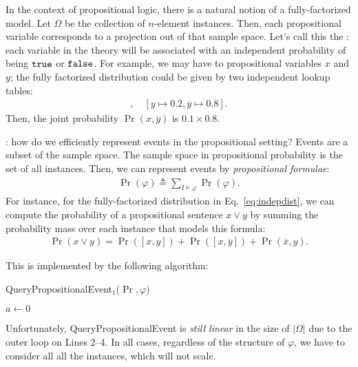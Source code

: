 \documentclass{tufte-handout}
\begin{document}
In the context of propositional logic, there is a natural notion of a
fully-factorized model. Let $\Omega$ be the collection of $n$-element instances.
Then, each propositional variable corresponds to a projection out of that sample
space. Let's call this the : each 
variable in the theory will be associated with an independent probability of 
being $\texttt{true}$ or $\texttt{false}$. For example, we may have to propositional variables $x$ and 
$y$; the fully factorized distribution could be given by two independent lookup tables:
\begin{align}
    [x \mapsto 0.1, \overline{x} \mapsto 0.9], \quad [y \mapsto 0.2, \overline{y} \mapsto 0.8].
    \label{eq:indepdist}
\end{align}
Then, the joint probability $\Pr(x, \overline{y})$ is $0.1 \times 0.8$.

: how do we efficiently represent 
events in the propositional setting? Events are a subset of the sample space. 
The sample space in propositional probability is the set of all instances. Then, 
we can represent events by \emph{propositional formulae}:
\begin{align}
    \Pr(\varphi) \triangleq \sum_{I \models \varphi} \Pr(\varphi).
\end{align}
For instance, for the fully-factorized 
distribution in Eq.~\ref{eq:indepdist}, we can compute the probability of a 
propositional sentence $x \lor y$ by summing the probability mass over each 
instance that models this formula:
\begin{align}
    \Pr(x \lor y) = \Pr([x, y]) + \Pr([x, \overline{y}]) + \Pr(\overline{x}, y).
\end{align}

This is implemented by the following algorithm:

\begin{algorithm}
    \caption{QueryPropositionalEvent$_1$($\Pr, \varphi)$}
    $a \leftarrow 0$\;
    \label{alg:enum}
\end{algorithm}


Unfortunately, QueryPropositionalEvent is \emph{still linear} in the size of
$|\Omega|$ due to the outer loop on Lines 2--4.  In all cases, regardless of the
structure of $\varphi$, we have to consider all all the instances, which will
not scale. 
\end{document}
